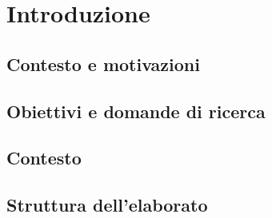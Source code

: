 \chapter{Introduzione}
\label{cha:intro}

\section{Contesto e motivazioni}
\label{sec:motivation}

\section{Obiettivi e domande di ricerca}
\label{sec:research_questions}

\section{Contesto}
\label{sec:context}

\section{Struttura dell'elaborato}
\label{sec:outline}
